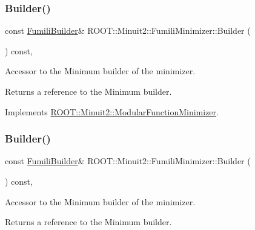 \subsubsection{\texorpdfstring{Builder()}{Builder()}\hspace{0.1cm}{\footnotesize\ttfamily [1/3]}}
{\footnotesize\ttfamily const \mbox{\hyperlink{classROOT_1_1Minuit2_1_1FumiliBuilder}{Fumili\+Builder}}\& R\+O\+O\+T\+::\+Minuit2\+::\+Fumili\+Minimizer\+::\+Builder (\begin{DoxyParamCaption}{ }\end{DoxyParamCaption}) const\hspace{0.3cm}{\ttfamily [inline]}, {\ttfamily [virtual]}}

Accessor to the Minimum builder of the minimizer.

\begin{DoxyReturn}{Returns}
a reference to the Minimum builder. 
\end{DoxyReturn}


Implements \mbox{\hyperlink{classROOT_1_1Minuit2_1_1ModularFunctionMinimizer_a13e98551cf14e927c61e1e34ecf8ba8b}{R\+O\+O\+T\+::\+Minuit2\+::\+Modular\+Function\+Minimizer}}.

\mbox{\label{classROOT_1_1Minuit2_1_1FumiliMinimizer_a24d20e7cd4a335f60616fd7cafe0739c}} 
\subsubsection{\texorpdfstring{Builder()}{Builder()}\hspace{0.1cm}{\footnotesize\ttfamily [2/3]}}
{\footnotesize\ttfamily const \mbox{\hyperlink{classROOT_1_1Minuit2_1_1FumiliBuilder}{Fumili\+Builder}}\& R\+O\+O\+T\+::\+Minuit2\+::\+Fumili\+Minimizer\+::\+Builder (\begin{DoxyParamCaption}{ }\end{DoxyParamCaption}) const\hspace{0.3cm}{\ttfamily [inline]}, {\ttfamily [virtual]}}

Accessor to the Minimum builder of the minimizer.

\begin{DoxyReturn}{Returns}
a reference to the Minimum builder. 
\end{DoxyReturn}


